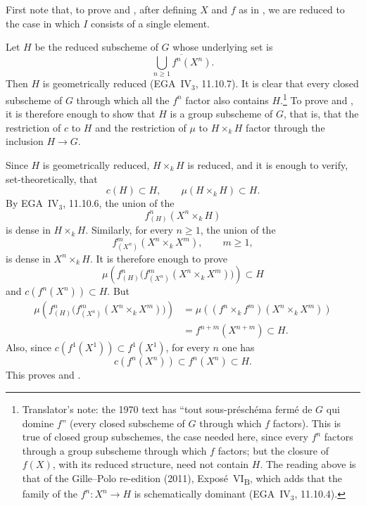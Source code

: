 First note that, to prove \textup{} and \textup{}, after defining \(X\) and \(f\) as
in \textup{}, we are reduced to the case in which \(I\)
consists of a single element.

Let \(H\) be the reduced subscheme of \(G\) whose underlying set
is
\[
  \overline{\bigcup_{n\geq1}f^n(X^n)}.
\]
Then \(H\) is geometrically reduced (EGA~IV\(_3\), 11.10.7). It
is clear that every closed subscheme of \(G\) through which all
the \(f^n\) factor also contains \(H\).\footnote{Translator's note: the 1970 text has ``tout sous-préschéma fermé de
\(G\) qui domine \(f\)'' (every closed subscheme of \(G\) through which \(f\) factors). This is true of closed
group subschemes, the case needed here, since every \(f^n\) factors through a group subscheme through which
\(f\) factors; but the closure of \(f(X)\), with its reduced structure, need not contain \(H\). The
reading above is that of the Gille--Polo re-edition (2011), Exposé~VI\textsubscript{B}, which adds that the
family of the \(f^n\colon X^n\to H\) is schematically dominant (EGA~IV\(_3\), 11.10.4).} To prove
\textup{} and \textup{}, it is therefore enough to show
that \(H\) is a group subscheme of \(G\), that is, that the
restriction of \(c\) to \(H\) and the restriction of \(\mu\) to
\(H\times_kH\) factor through the inclusion \(H\to G\).

Since \(H\) is geometrically reduced, \(H\times_kH\) is reduced,
and it is enough to verify, set-theoretically, that
\[
  c(H)\subset H,
  \qquad
  \mu(H\times_kH)\subset H.
\]
By EGA~IV\(_3\), 11.10.6, the union of the
\[
  f^n_{(H)}(X^n\times_kH)
\]
is dense in \(H\times_kH\). Similarly, for every
\(n\geq1\), the union of the
\[
  f^m_{(X^n)}(X^n\times_kX^m),
  \qquad m\geq1,
\]
is dense in \(X^n\times_kH\). It is therefore
enough to prove
\[
  \mu\!\left(
    f^n_{(H)}
      \bigl(f^m_{(X^n)}(X^n\times_kX^m)\bigr)
  \right)\subset H
\]
and \(c(f^n(X^n))\subset H\). But
\[
\begin{aligned}
  \mu\!\left(
    f^n_{(H)}
      \bigl(f^m_{(X^n)}(X^n\times_kX^m)\bigr)
  \right)
  &=
  \mu\!\left((f^n\times_k f^m)(X^n\times_kX^m)\right)\\
  &=f^{n+m}(X^{n+m})\subset H.
\end{aligned}
\]
Also, since \(c(f^1(X^1))\subset f^1(X^1)\), for every \(n\)
one has
\[
  c(f^n(X^n))\subset f^n(X^n)\subset H.
\]
This proves \textup{} and \textup{}.

